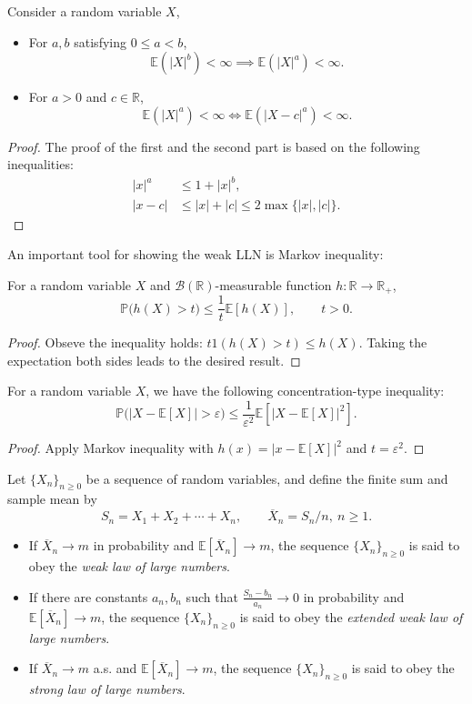 \begin{proposition}
Consider a random variable $X$,
\begin{itemize}
\item
For $a,b$ satisfying $0\le a<b$, 
\[
\mathbb{E}(|X|^b)<\infty\implies \mathbb{E}(|X|^a)<\infty.
\]
\item
For $a>0$ and $c\in\mathbb{R}$,
\[
\mathbb{E}(|X|^a)<\infty\Longleftrightarrow
\mathbb{E}(|X-c|^a)<\infty.
\]
\end{itemize}
\end{proposition}
\begin{proof}
The proof of the first and the second part is based on the following inequalities:
\begin{align*}
|x|^a&\le 1+|x|^b,\\
|x-c|&\le |x|+|c|\le2\max\{|x|,|c|\}.
\end{align*}
\end{proof}

An important tool for showing the weak LLN is Markov inequality:
\begin{proposition}
For a random variable $X$ and $\mathcal{B}(\mathbb{R})$-measurable function $h:\mathbb{R}\to\mathbb{R}_+$,
\[
\mathbb{P}\bigg(
h(X)>t
\bigg)\le \frac{1}{t}\mathbb{E}[h(X)],\qquad t>0.
\]
\end{proposition}
\begin{proof}
Obseve the inequality holds: $t1(h(X)>t)\le h(X)$. Taking the expectation both sides leads to the desired result.
\end{proof}

\begin{corollary}
For a random variable $X$, we have the following concentration-type inequality:
\[
\mathbb{P}\bigg(
|X-\mathbb{E}[X]|>\varepsilon
\bigg)
\le\frac{1}{\varepsilon^2}\mathbb{E}[|X-\mathbb{E}[X]|^2].
\]
\end{corollary}
\begin{proof}
Apply Markov inequality with $h(x) = |x - \mathbb{E}[X]|^2$ and $t=\varepsilon^2$.
\end{proof}

Let $\{X_n\}_{n\ge0}$ be a sequence of random variables, and define the finite sum and sample mean by
\[
S_n = X_1+X_2+\cdots+X_n,\qquad
\overline{X}_n=S_n/n,~n\ge1.
\]
\begin{itemize}
\item
If  
$\overline{X}_n\to m$ in probability
and
$\mathbb{E}[\overline{X}_n]\to m$,
the sequence $\{X_n\}_{n\ge0}$ is said to {obey} the \emph{weak law of large numbers}.
\item
If
there are constants $a_n,b_n$ such that $\frac{S_n-b_n}{a_n}\to 0$ in probability
and
$\mathbb{E}[\overline{X}_n]\to m$,
the sequence $\{X_n\}_{n\ge0}$ is said to {obey} the \emph{extended weak law of large numbers}.
\item
If
$\overline{X}_n\to m$ a.s.
and
$\mathbb{E}[\overline{X}_n]\to m$,
the sequence $\{X_n\}_{n\ge0}$ is said to {obey} the \emph{strong law of large numbers}.
\end{itemize}

